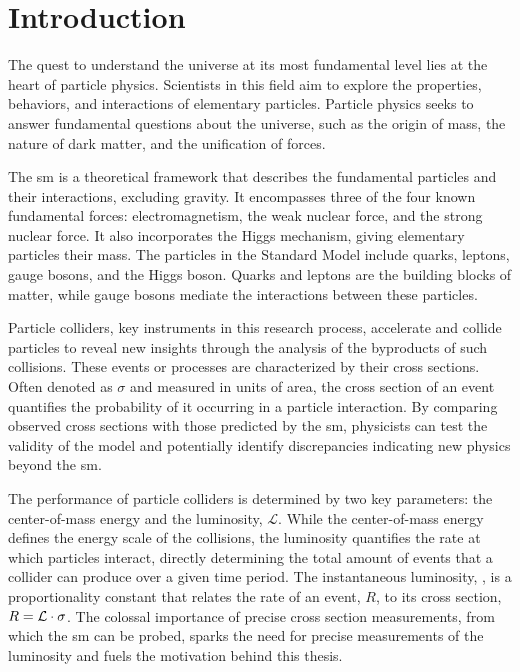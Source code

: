 \chapter{Introduction}


The quest to understand the universe at its most fundamental level lies at the heart of particle physics. Scientists in this field aim to explore the properties, behaviors, and interactions of elementary particles. Particle physics seeks to answer fundamental questions about the universe, such as the origin of mass, the nature of dark matter, and the unification of forces.

The \acrfull{sm} is a theoretical framework that describes the fundamental particles and their interactions, excluding gravity. It encompasses three of the four known fundamental forces: electromagnetism, the weak nuclear force, and the strong nuclear force. It also incorporates the Higgs mechanism, giving elementary particles their mass. The particles in the Standard Model include quarks, leptons, gauge bosons, and the Higgs boson. Quarks and leptons are the building blocks of matter, while gauge bosons mediate the interactions between these particles.

Particle colliders, key instruments in this research process, accelerate and collide particles to reveal new insights through the analysis of the byproducts of such collisions. These events or processes are characterized by their cross sections. Often denoted as $\sigma$ and measured in units of area, the cross section of an event quantifies the probability of it occurring in a particle interaction. By comparing observed cross sections with those predicted by the \acrshort{sm}, physicists can test the validity of the model and potentially identify discrepancies indicating new physics beyond the \acrshort{sm}.

The performance of particle colliders is determined by two key parameters: the center-of-mass energy and the luminosity, $\mathcal{L}$. While the center-of-mass energy defines the energy scale of the collisions, the luminosity quantifies the rate at which particles interact, directly determining the total amount of events that a collider can produce over a given time period. The instantaneous luminosity, \ilum, is a proportionality constant that relates the rate of an event, $R$, to its cross section, $R = \mathcal{L}  \cdot \sigma$. The colossal importance of precise cross section measurements, from which the \acrshort{sm} can be probed, sparks the need for precise measurements of the luminosity and fuels the motivation behind this thesis.

